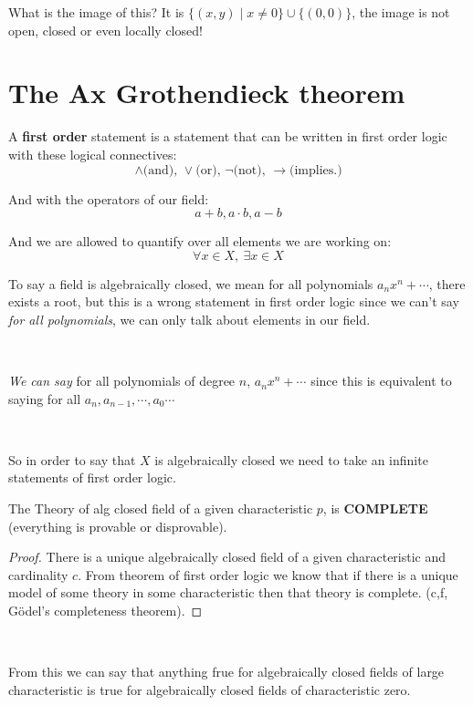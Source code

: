 What is the image of this? It is $\{(x,y)\mid x\neq 0\}\cup \{(0,0)\}$, the image is not open, closed or even locally closed!



\section{The Ax Grothendieck theorem}
\begin{definition}
    A \textbf{first order} statement is a statement that can be written in first order logic with these logical connectives:\[\wedge \text{(and), }  \lor \text{(or), } \neg \text{(not), }\rightarrow\text{(implies.)} \] 

And with the operators of our field:\[a+b, a\cdot b, a-b\]

And we are allowed to quantify over all elements we are working on:\[\forall x\in X, \ \exists x\in X\]
\begin{example}
    To say a field is algebraically closed, we mean for all polynomials $a_nx^n+\cdots$, there exists a root, but this is a wrong statement in first order logic since we can't say \textit{ for all polynomials}, we can only talk about elements in our field.
    
    \

    \textit{We can say} for all polynomials of degree $n$, $a_nx^n+\cdots$ since this is equivalent to saying for all $a_n,a_{n-1},\cdots, a_0\cdots$

    \

    So in order to say that $X$ is algebraically closed we need to take an infinite statements of first order logic.
\end{example}
\end{definition}

\begin{theorem}
    The Theory of alg closed field of a given characteristic $p$, is \textbf{COMPLETE} (everything is provable or disprovable).
    \begin{proof}
        There is a unique algebraically closed field of a given characteristic and cardinality $c$. From theorem of first order logic we know that if there is a unique model of some theory in some characteristic then that theory is complete. (c,f, Gödel's completeness theorem).
    \end{proof}
\end{theorem}

\

From this we can say that anything frue for algebraically closed fields of large characteristic is true for algebraically closed fields of characteristic zero.

